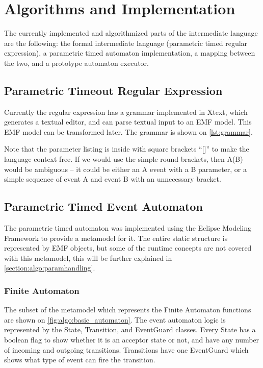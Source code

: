 \chapter{Algorithms and Implementation}

The currently implemented and algorithmized parts of the intermediate language are the following: the formal intermediate language (parametric timed regular expression), a parametric timed automaton implementation, a mapping between the two, and a prototype automaton executor.

\section{Parametric Timeout Regular Expression}

Currently the regular expression has a grammar implemented in Xtext, which generates a textual editor, and can parse textual input to an EMF model. This EMF model can be transformed later. 
The grammar is shown on \cref{lst:grammar}. 

Note that the parameter listing is inside with square brackets ``[]'' to make the language context free. If we would use the simple round brackets, then A(B) would be ambiguous -- it could be either an A event with a B parameter, or a simple sequence of event A and event B with an unnecessary bracket.

\section{Parametric Timed Event Automaton}

The parametric timed automaton was implemented using the Eclipse Modeling Framework to provide a metamodel for it. The entire static structure is represented by EMF objects, but some of the runtime concepts are not covered with this metamodel, this will be further explained in \cref{section:algo:paramhandling}.

\subsection{Finite Automaton}

The subset of the metamodel which represents the Finite Automaton functions are shown on \cref{fig:algo:basic_automaton}.
The event automaton logic is represented by the State, Transition, and EventGuard classes.
Every State has a boolean flag to show whether it is an acceptor state or not, and have any number of incoming and outgoing transitions.
Transitions have one EventGuard which shows what type of event can fire the transition. 

